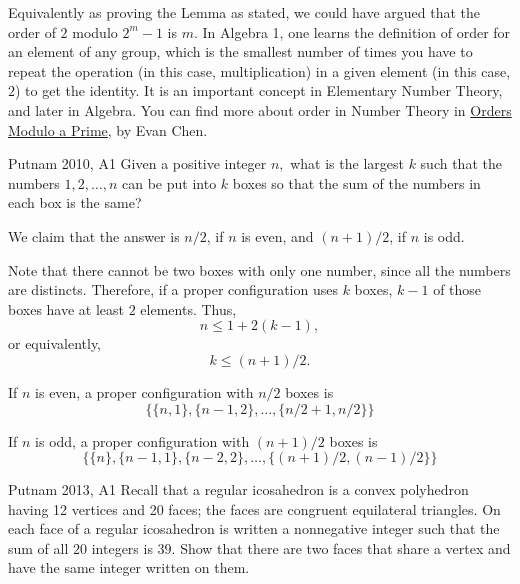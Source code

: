 	Equivalently as proving the Lemma as stated, we could have argued that the order of \(2\) modulo \(2^m - 1\) is \(m\). In Algebra 1, one learns the definition of order for an element of any group,  which is the smallest number of times you have to repeat the operation (in this case, multiplication) in a given element (in this case, \(2\)) to get the identity. It is an important concept in Elementary Number Theory, and later in Algebra. You can find more about order in Number Theory in \href{https://web.evanchen.cc/handouts/ORPR/ORPR.pdf}{Orders Modulo a Prime}, by Evan Chen.

\begin{prob}{Putnam 2010, A1}{}
Given a positive integer $n,$ what is the largest $k$ such that the numbers $1,2,\dots,n$ can be put into $k$ boxes so that the sum of the numbers in each box is the same?
\end{prob}

\begin{sol}{}{}
	We claim that the answer is \(n/2\), if \(n\) is even, and \((n+1)/2\), if \(n\) is odd.

	Note that there cannot be two boxes with only one number, since all the numbers are distincts. Therefore, if a proper configuration uses \(k\) boxes, \(k - 1\) of those boxes have at least \(2\) elements. Thus, \[
		n \leq 1 + 2(k-1),
	\]
	or equivalently, \[
		k \leq (n + 1)/2.
	\]

	If \(n\) is even, a proper configuration with \(n/2\) boxes is \[
		\{\{n, 1\}, \{n - 1, 2\}, \dots, \{n/2 + 1, n/2\}\}
	\]

	If \(n\) is odd, a proper configuration with \((n+1)/2\) boxes is \[
		\{\{n\}, \{n-1, 1\}, \{n - 2, 2\}, \dots, \{(n+1)/2, (n-1)/2\}\}
	\]
	
\end{sol}

\begin{prob}{Putnam 2013, A1}{}
Recall that a regular icosahedron is a convex polyhedron having 12 vertices and 20 faces; the faces are congruent equilateral triangles. On each face of a regular icosahedron is written a nonnegative integer such that the sum of all $20$ integers is $39.$ Show that there are two faces that share a vertex and have the same integer written on them.
\end{prob}

